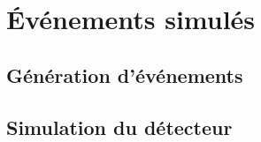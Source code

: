\section{Événements simulés}\label{chapter-LHC-section-MC}

\subsection{Génération d'événements}\label{chapter-LHC-section-MC-subsec-evt_gen}

\subsection{Simulation du détecteur}\label{chapter-LHC-section-MC-subsec-detector_sim}
